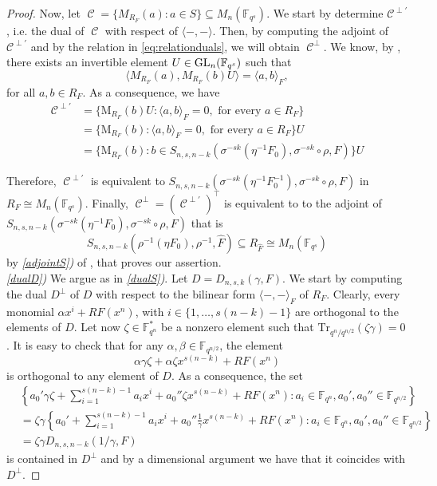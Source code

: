 \documentclass[a4paper, 11pt]{article}
\DeclareMathOperator{\C}{\mathcal{C}}
\newcommand{\F}{{\mathbb F}}
\newcommand{\Tr}{{\mathrm{Tr}}}
\newcommand{\GL}{\hbox{{\rm GL}}}
\newcommand{\M}{\mathrm{M}}
\begin{document}
\begin{proof}
Now, let 
\(
\C=\{M_{R_F}(a) \colon a \in S\} \subseteq M_n(\F_{q^s}).
\)
We start by determine $\mathcal{C}^{\perp'}$, i.e. the dual of $\C$ with respect of $\langle -, - \rangle$. Then, by computing the adjoint of $\mathcal{C}^{\perp'}$ and by the relation in \eqref{eq:relationduals}, we will obtain $\C^{\perp}$. We know, by , there exists an invertible element $U \in \GL_n(\F_{q^s})$ such that 
\[
\langle M_{R_F}(a), M_{R_F}(b) U  \rangle= \langle a,b \rangle_F,
\]
for all \(a,b \in R_F\). As a consequence, we have
\[
\begin{split}
\C^{\perp'} &= \{\M_{R_F}(b)U: \langle a,b   \rangle_F=0, \mbox{ for every }a \in R_F\} \\
&= \{\M_{R_F}(b): \langle a,b  \rangle_F=0, \mbox{ for every } a \in R_F\}U \\
&= \{\M_{R_F}(b): b \in S_{n,s,n-k}(\sigma^{-sk}(\eta^{-1}F_0), \sigma^{-sk} \circ \rho,F) \}U
\end{split}
\]

Therefore, $\C^{\perp'}$ is equivalent to $S_{n,s,n-k}(\sigma^{-sk}(\eta^{-1}F_0^{-1}), \sigma^{-sk} \circ \rho,F)$ in $R_F \cong M_n(\F_{q^s})$. Finally, $\C^{\perp}=(\C^{\perp'})^{\top}$ is equivalent to to the adjoint of $S_{n,s,n-k}(\sigma^{-sk}(\eta^{-1}F_0), \sigma^{-sk} \circ \rho,F)$ that is
\[
S_{n,s,n-k}(\rho^{-1}(\eta F_0),  \rho^{-1},\hat{F}) \subseteq R_{\hat{F}} \cong M_n(\F_{q^s})
\]
by \emph{\ref{adjointS})} of , that proves our assertion. \\
\emph{\ref{dualD})} We argue as in \emph{\ref{dualS})}. Let $D=D_{n,s,k}(\gamma,F)$. We start by computing the dual $D^{\perp}$ of $D$ with respect to the bilinear form $\langle -,- \rangle_F$ of $R_F$. 
Clearly, every monomial $\alpha x^i+RF(x^n)$, with $i \in \{1,\ldots,s(n-k)-1\}$ are orthogonal to the elements of $D$. Let now $\zeta \in \F_{q^n}^*$ be a nonzero element such that $\Tr_{q^n/q^{n/2}}(\zeta \gamma)=0$. It is easy to check that for any $\alpha,\beta \in \F_{q^{n/2}}$, the element \[\alpha \gamma \zeta +\alpha \zeta x^{s(n-k)}+RF(x^n)\] is orthogonal to any element of $D$.
As a consequence, the set \[
\begin{split}
&\left\{a_0'\gamma \zeta+\sum\limits_{i=1}^{s(n-k)-1}a_ix^i+a_0''\zeta x^{s(n-k)}+RF(x^n) \colon a_i \in \F_{q^n},a_0',a_0'' \in \F_{q^{n/2}} \right\} \\
&= \zeta \gamma \left\{a_0'+\sum\limits_{i=1}^{s(n-k)-1}a_ix^i+a_0''\frac{1}{\gamma} x^{s(n-k)} + RF(x^n) \colon a_i \in \F_{q^n},a_0',a_0'' \in \F_{q^{n/2}} \right\} \\
&= \zeta \gamma D_{n,s,n-k}(1/\gamma,F)
\end{split}
\]
is contained in $D^{\perp}$ and by a dimensional argument we have that it coincides with $D^{\perp}$.


\end{proof}
\end{document}
